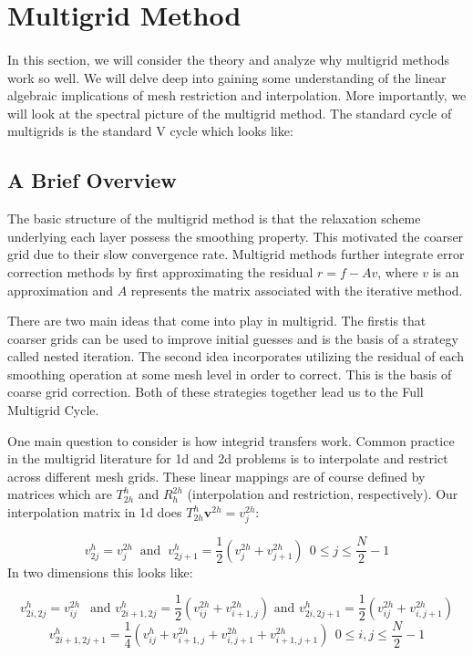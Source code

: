 \documentclass[pdftex,12pt,a4paper]{article}
\begin{document}
\section{ Multigrid Method}

\paragraph{} In this section, we will consider the theory and analyze why multigrid methods work so well.  We will delve deep into gaining some understanding of the linear algebraic implications of mesh restriction and interpolation.  More importantly, we will look at the spectral picture of the multigrid method.  The standard cycle of multigrids is the standard V cycle which looks like: 

\subsection{A Brief Overview}
The basic structure of the multigrid method is that the relaxation scheme underlying each layer possess the smoothing property.  This motivated the coarser grid due to their slow convergence rate.  Multigrid methods further integrate error correction methods by first approximating the residual $r = f - Av$, where $v$ is an approximation and $A$ represents the matrix associated with the iterative method. 

There are two main ideas that come into play in multigrid.  The firstis that coarser grids can be used to improve initial guesses and is the basis of a strategy called nested iteration.  The second idea incorporates utilizing the residual of each smoothing operation at some mesh level in order to correct.  This is the basis of coarse grid correction.  Both of these strategies together lead us to the Full Multigrid Cycle.  

One main question to consider is how integrid transfers work.  Common practice in the multigrid literature for 1d and 2d problems is to interpolate and restrict across different mesh grids.  These linear mappings are of course defined by matrices which are $T_{2h}^h$ and $R_h^{2h}$ (interpolation and restriction, respectively).  Our interpolation matrix in 1d does $T_{2h}^h \mathbf{v}^{2h} = v_j^{2h}$:

$$
v_{2j}^h = v_j^{2h} ~ \text{ and } ~ v_{2j+1}^h = \frac 1 2 ( v_j^{2h} + v_{j+1}^{2h}) ~~  0 \leq j \leq \frac N 2 - 1
$$
In two dimensions this looks like: 

$$
v_{2i, 2j}^h = v_{ij}^{2h} ~~ \text{ and } v_{2i+1, 2j}^h = \frac 1 2 \left( v_{ij}^{2h} + v_{i+1, j}^{2h} \right) \text{ and } v_{2i, 2j+1}^h = \frac 1 2 \left( v_{ij}^{2h} + v_{i, j+1}^{2h} \right)
$$
$$ 
v_{2i+1, 2j+1}^h = \frac 1 4 \left( v_{ij}^h + v_{i+1, j}^{2h} + v_{i, j+1}^{2h} + v_{i+1, j+1}^{2h} \right) ~~ 0 \leq i, j \leq \frac N 2 -1
$$
\end{document}
